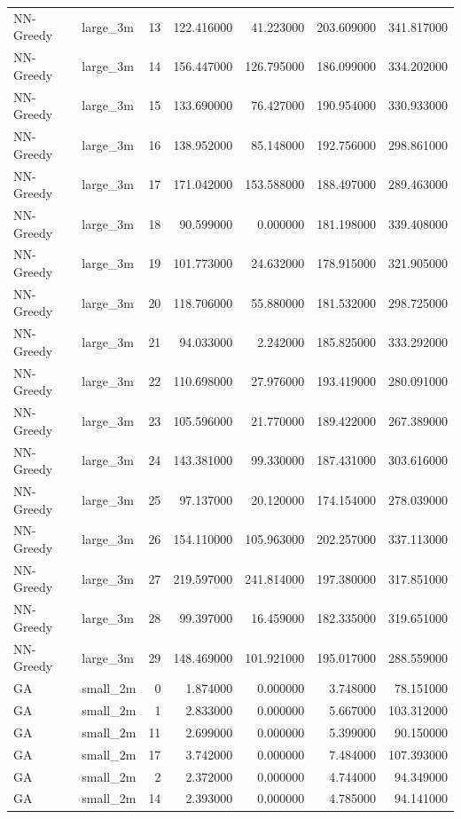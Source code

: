 \begin{tabular}{llrrrrr}
NN-Greedy & large_3m & 13 & 122.416000 & 41.223000 & 203.609000 & 341.817000 \\
NN-Greedy & large_3m & 14 & 156.447000 & 126.795000 & 186.099000 & 334.202000 \\
NN-Greedy & large_3m & 15 & 133.690000 & 76.427000 & 190.954000 & 330.933000 \\
NN-Greedy & large_3m & 16 & 138.952000 & 85.148000 & 192.756000 & 298.861000 \\
NN-Greedy & large_3m & 17 & 171.042000 & 153.588000 & 188.497000 & 289.463000 \\
NN-Greedy & large_3m & 18 & 90.599000 & 0.000000 & 181.198000 & 339.408000 \\
NN-Greedy & large_3m & 19 & 101.773000 & 24.632000 & 178.915000 & 321.905000 \\
NN-Greedy & large_3m & 20 & 118.706000 & 55.880000 & 181.532000 & 298.725000 \\
NN-Greedy & large_3m & 21 & 94.033000 & 2.242000 & 185.825000 & 333.292000 \\
NN-Greedy & large_3m & 22 & 110.698000 & 27.976000 & 193.419000 & 280.091000 \\
NN-Greedy & large_3m & 23 & 105.596000 & 21.770000 & 189.422000 & 267.389000 \\
NN-Greedy & large_3m & 24 & 143.381000 & 99.330000 & 187.431000 & 303.616000 \\
NN-Greedy & large_3m & 25 & 97.137000 & 20.120000 & 174.154000 & 278.039000 \\
NN-Greedy & large_3m & 26 & 154.110000 & 105.963000 & 202.257000 & 337.113000 \\
NN-Greedy & large_3m & 27 & 219.597000 & 241.814000 & 197.380000 & 317.851000 \\
NN-Greedy & large_3m & 28 & 99.397000 & 16.459000 & 182.335000 & 319.651000 \\
NN-Greedy & large_3m & 29 & 148.469000 & 101.921000 & 195.017000 & 288.559000 \\
GA & small_2m & 0 & 1.874000 & 0.000000 & 3.748000 & 78.151000 \\
GA & small_2m & 1 & 2.833000 & 0.000000 & 5.667000 & 103.312000 \\
GA & small_2m & 11 & 2.699000 & 0.000000 & 5.399000 & 90.150000 \\
GA & small_2m & 17 & 3.742000 & 0.000000 & 7.484000 & 107.393000 \\
GA & small_2m & 2 & 2.372000 & 0.000000 & 4.744000 & 94.349000 \\
GA & small_2m & 14 & 2.393000 & 0.000000 & 4.785000 & 94.141000 \\

\end{tabular}
